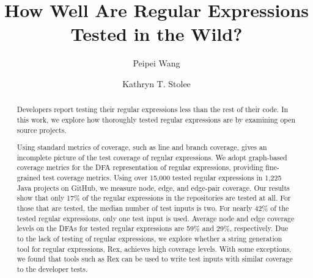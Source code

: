 \documentclass[sigconf,screen]{acmart}
\begin{document}
\title{How Well Are Regular Expressions Tested in the Wild?}


\iftrue
\author{Peipei Wang}

\author{Kathryn T. Stolee}

\fi



\begin{abstract}
Developers report testing their regular expressions less than the rest of their code. In this work, we explore how thoroughly tested regular expressions are by examining open source projects. 

Using standard metrics of coverage, such as line and branch coverage, gives an incomplete picture of the test coverage of regular expressions. We adopt graph-based coverage metrics for the DFA representation of regular expressions, providing fine-grained test coverage metrics. Using over 15,000 tested regular expressions in 1,225 Java projects on GitHub, we measure node, edge, and edge-pair coverage. Our results show that only 17\% of the regular expressions in the repositories are tested at all. For those that are tested,  the median number of test inputs is two. For nearly 42\%  of the tested regular expressions, only one test input is used. Average node and edge coverage levels on the DFAs for tested regular expressions are 59\% and 29\%, respectively. Due to the lack of testing of regular expressions, we explore whether a string generation tool for regular expressions, Rex, achieves high coverage levels. With some exceptions, we found that tools such as Rex can be used to write test inputs with similar coverage to the developer tests. 
\end{abstract}
\end{document}
